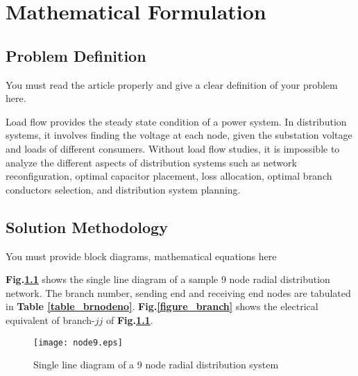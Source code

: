 \documentclass[a4paper,12pt,oneside]{report}%
\begin{document}
\chapter{Mathematical Formulation}
\label{chapmf}
\section{Problem Definition}
You must read the article properly and give a clear definition of your problem here.
\par
Load flow provides the steady state condition of a power system. In distribution systems, it involves finding the voltage at each node, given the substation voltage and loads of different consumers. Without load flow studies, it is impossible to analyze the different aspects of distribution systems such as network reconfiguration, optimal capacitor placement, loss allocation, optimal branch conductors selection, and distribution system planning.
\par
\section{Solution Methodology}
\vspace{-0.1in}
You must provide block diagrams, mathematical equations here


\textbf{Fig.\ref{figure_9bus}} shows the single line diagram of a sample 9 node radial distribution network. The branch
number, sending end and receiving end nodes are tabulated in \textbf{Table
\ref{table_brnodeno}}. \textbf{Fig.\ref{figure_branch}} shows the electrical
equivalent of branch-$jj$ of \textbf{Fig.\ref{figure_9bus}}.



\begin{figure}[!h]
\centering
 \texttt{[image: node9.eps]}
\caption{Single line diagram of a 9 node radial distribution system}
\label{figure_9bus}
\end{figure}
\end{document}

